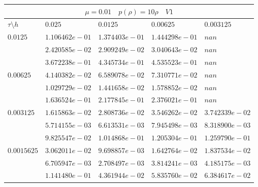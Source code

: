 \documentclass[a4paper,12pt]{extarticle}
\begin{document}
\begin{tabular}{|l|l|l|l|l|}
	\hline
	\multicolumn{5}{|c|}{$\mu =0.01 \quad  p(\rho) =10 \rho \quad V1$}\\
	\hline
	$\tau\setminus h$ & $0.025$ & $0.0125$ & $0.00625$ & $0.003125$\\
	\hline
	$0.0125$  & $1.106462e-01$ & $1.374403e-01$ & $1.444298e-01$ & $nan$\\
	& $2.420585e-02$ & $2.909249e-02$ & $3.040643e-02$ & $nan$\\
	& $3.672238e-01$ & $4.345734e-01$ & $4.535523e-01$ & $nan$\\
	\hline
	$0.00625$  & $4.140382e-02$ & $6.589078e-02$ & $7.310771e-02$ & $nan$\\
	& $1.029729e-02$ & $1.441658e-02$ & $1.578852e-02$ & $nan$\\
	& $1.636524e-01$ & $2.177845e-01$ & $2.376021e-01$ & $nan$\\
	\hline
	$0.003125$  & $1.615863e-02$ & $2.808736e-02$ & $3.546262e-02$ & $3.742339e-02$\\
	& $5.714155e-03$ & $6.613531e-03$ & $7.945498e-03$ & $8.318900e-03$\\
	& $9.825547e-02$ & $1.014868e-01$ & $1.205304e-01$ & $1.259790e-01$\\
	\hline
	$0.0015625$  & $3.062011e-02$ & $9.698857e-03$ & $1.642764e-02$ & $1.837534e-02$\\
	& $6.705947e-03$ & $2.708497e-03$ & $3.814241e-03$ & $4.185175e-03$\\
	& $1.141480e-01$ & $4.361944e-02$ & $5.835760e-02$ & $6.384617e-02$\\
	\hline
\end{tabular}
\end{document}

